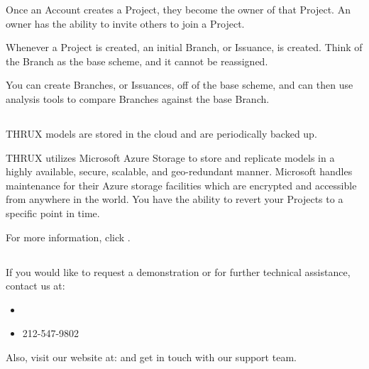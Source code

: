 \documentclass[letterpaper,10pt,english]{sphinxmanual}
\begin{document}
Once an Account creates a Project, they become the owner of that Project.  An owner has the ability to invite others to join a Project.

Whenever a Project is created, an initial Branch, or Issuance, is created.  Think of the Branch as the base scheme, and it cannot be reassigned.

You can create Branches, or Issuances, off of the base scheme, and can then use analysis tools to compare Branches against the base Branch.


\section{}
\label{\detokenize{docs/introduction/index-thrux:storage-and-recovery-options}}
THRUX models are stored in the cloud and are periodically backed up.

THRUX utilizes Microsoft Azure Storage to store and replicate models in a highly available, secure, scalable, and geo-redundant manner.  Microsoft handles maintenance for their Azure storage facilities which are encrypted and accessible from anywhere in the world.  You have the ability to revert your Projects to a specific point in time.

For more information, click {\hyperref[\detokenize{docs/userguide/index-user_guide:recovery-options}]{}}.


\section{}
\label{\detokenize{docs/introduction/index-thrux:contact-us-support}}\label{\detokenize{docs/introduction/index-thrux:support}}
If you would like to request a demonstration or for further technical assistance, contact us at:
\begin{itemize}
\item {} 

\item {} 
212-547-9802

\end{itemize}

Also, visit our website at:  and get in touch with our support team.


\chapter{}
\label{\detokenize{docs/index:product-overview}}\label{\detokenize{docs/productoverview/index-product_overview:product-overview}}
\end{document}
